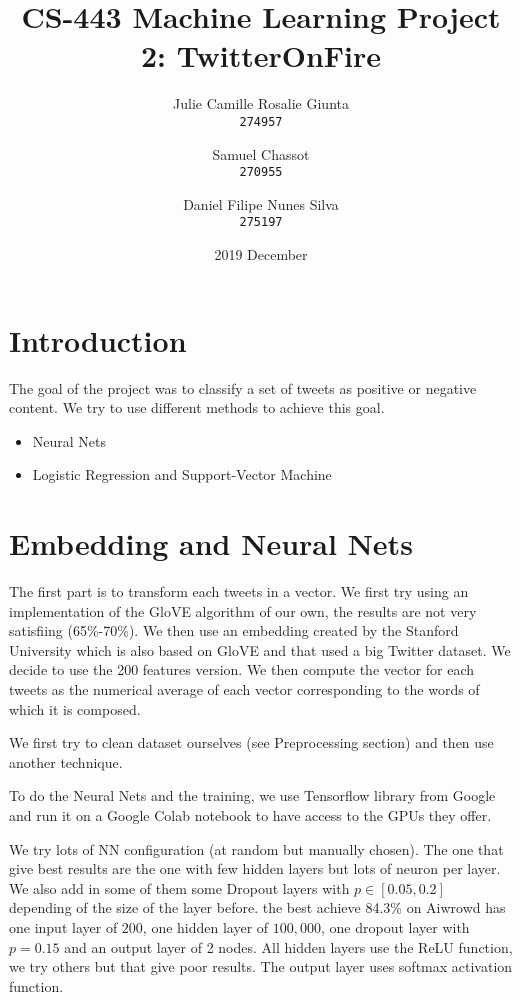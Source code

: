 \documentclass[11pt, a4paper, twocolumn]{article}
\begin{document}
\date{2019 December}
\title{CS-443 Machine Learning Project 2: TwitterOnFire}
\author{
  Julie Camille Rosalie Giunta\\
  \texttt{274957}
  \and
  Samuel Chassot\\
  \texttt{270955}
  \and
  Daniel Filipe Nunes Silva\\
  \texttt{275197}
}

\maketitle
\clearpage

\section{Introduction}
The goal of the project was to classify a set of tweets as positive or negative content. We try to use different methods to achieve this goal.

\begin{itemize}
  \item Neural Nets
	\item Logistic Regression and Support-Vector Machine
\end{itemize}

\section{Embedding and Neural Nets}
The first part is to transform each tweets in a vector. We first try using an implementation of the GloVE algorithm of our own, the results are not very satisfiing (65\%-70\%). We then use an embedding created by the Stanford University which is also based on GloVE and that used a big Twitter dataset. We decide to use the 200 features version.
We then compute the vector for each tweets as the numerical average of each vector corresponding to the words of which it is composed.

We first try to clean dataset ourselves (see Preprocessing section) and then use another technique. 

To do the Neural Nets and the training, we use Tensorflow library from Google and run it on a Google Colab notebook to have access to the GPUs they offer.

We try lots of NN configuration (at random but manually chosen). The one that give best results are the one with few hidden layers but lots of neuron per layer. We also add in some of them some Dropout layers with $p\in [0.05, 0.2]$ depending of the size of the layer before.
the best achieve 84.3\% on Aiwrowd has one input layer of $200$, one hidden layer of $100,000$, one dropout layer with $p=0.15$ and an output layer of 2 nodes. All hidden layers use the ReLU function, we try others but that give poor results. The output layer uses softmax activation function.
\end{document}
